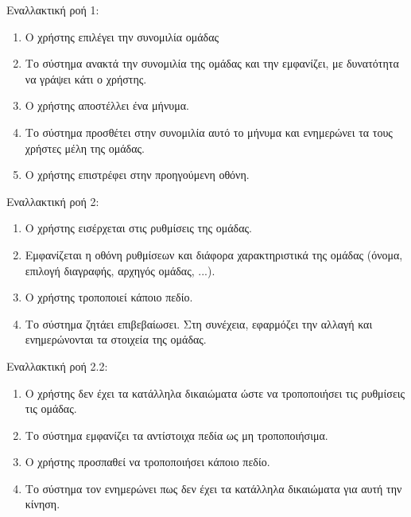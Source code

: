 Εναλλακτική ροή 1:
\begin{enumerate}[label=3.\alph*.,ref=3.\alph*]
\item Ο χρήστης επιλέγει την συνομιλία ομάδας
\item Το σύστημα ανακτά την συνομιλία της ομάδας και την εμφανίζει, με δυνατότητα να γράψει κάτι ο χρήστης.
\item Ο χρήστης αποστέλλει ένα μήνυμα.
\item Το σύστημα προσθέτει στην συνομιλία αυτό το μήνυμα και ενημερώνει τα τους χρήστες μέλη της ομάδας.
\item Ο χρήστης επιστρέφει στην προηγούμενη οθόνη.
\end{enumerate}

Εναλλακτική ροή 2:
\begin{enumerate}[label=3.\alph*.,ref=3.\alph*]
\item Ο χρήστης εισέρχεται στις ρυθμίσεις της ομάδας.
\item Εμφανίζεται η οθόνη ρυθμίσεων και διάφορα χαρακτηριστικά της ομάδας (όνομα, επιλογή διαγραφής, αρχηγός ομάδας, ...).
\item Ο χρήστης τροποποιεί κάποιο πεδίο.
\item Το σύστημα ζητάει επιβεβαίωσει. Στη συνέχεια, εφαρμόζει την αλλαγή και ενημερώνονται τα στοιχεία της ομάδας.
\end{enumerate}

Εναλλακτική ροή 2.2:
\begin{enumerate}[label=3.3.\alph*.,ref=3.3.\alph*]
\item Ο χρήστης δεν έχει τα κατάλληλα δικαιώματα ώστε να τροποποιήσει τις ρυθμίσεις τις ομάδας.
\item Το σύστημα εμφανίζει τα αντίστοιχα πεδία ως μη τροποποιήσιμα.
\item Ο χρήστης προσπαθεί να τροποποιήσει κάποιο πεδίο.
\item Το σύστημα τον ενημερώνει πως δεν έχει τα κατάλληλα δικαιώματα για αυτή την κίνηση.
\end{enumerate}




\newpage
